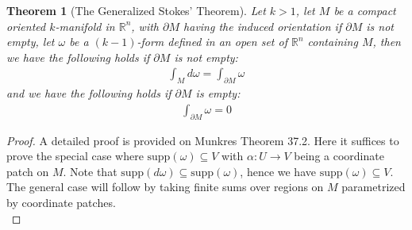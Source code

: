 \documentclass[11pt,oneside]{book}
\theoremstyle{break}
\theoremstyle{break}
\newtheorem{thm}{Theorem}[section]
\newcommand{\R}{\mathbb{R}}
\begin{document}
\begin{thm}[The Generalized Stokes' Theorem]
Let $k>1$, let $M$ be a compact oriented $k$-manifold in $\R^n$, with $\partial M$ having the induced orientation if $\partial M$ is not empty, let $\omega$ be a $(k-1)$-form defined in an open set of $\R^n$ containing $M$, then we have the following holds if $\partial M$ is not empty:
\begin{align*}
\int_M d\omega  = \int_{\partial M}\omega
\end{align*}
and we have the following holds if $\partial M$ is empty:
\begin{align*}
\int_{\partial M}\omega = 0
\end{align*}
\end{thm}
\begin{proof}
A detailed proof is provided on Munkres Theorem 37.2. Here it suffices to prove the special case where $\text{supp}(\omega) \subseteq V$ with $\alpha:U \to V$ being a coordinate patch on $M$. Note that $\text{supp}(d\omega) \subseteq \text{supp}(\omega)$, hence we have $\text{supp}(\omega) \subseteq V$. The general case will follow by taking finite sums over regions on $M$ parametrized by coordinate patches. \\


\end{proof}
\end{document}
